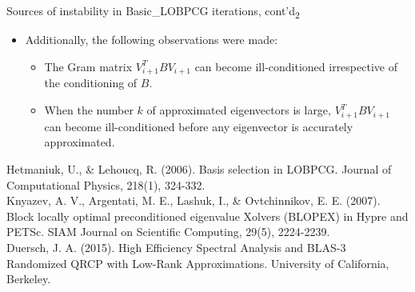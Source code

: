 \documentclass[t,usepdftitle=false]{beamer}
\begin{document}
\begin{frame}{Sources of instability in Basic\_LOBPCG iterations, cont'd\textsubscript{2}}
	\begin{itemize}
	\item Additionally, the following observations were made:\smallskip
	\begin{itemize}
		\item The Gram matrix $V_{i+1}^TBV_{i+1}$ can become ill-conditioned irrespective of the conditioning of $B$.
		\item When the number $k$ of approximated eigenvectors is large, $V_{i+1}^TBV_{i+1}$ can become ill-conditioned before any eigenvector is accurately approximated.
	\end{itemize}	
	\end{itemize}
	\medskip
	\tiny{Hetmaniuk, U., \& Lehoucq, R. (2006). Basis selection in LOBPCG. Journal of Computational Physics, 218(1), 324-332.}\tinyskip\\
	\tiny{Knyazev, A. V., Argentati, M. E., Lashuk, I., \& Ovtchinnikov, E. E. (2007). Block locally optimal preconditioned eigenvalue Xolvers (BLOPEX) in Hypre and PETSc. SIAM Journal on Scientific Computing, 29(5), 2224-2239.}\tinyskip\\	
	\tiny{Duersch, J. A. (2015). High Efficiency Spectral Analysis and BLAS-3 Randomized QRCP with Low-Rank Approximations. University of California, Berkeley.}
\end{frame}
\end{document}
